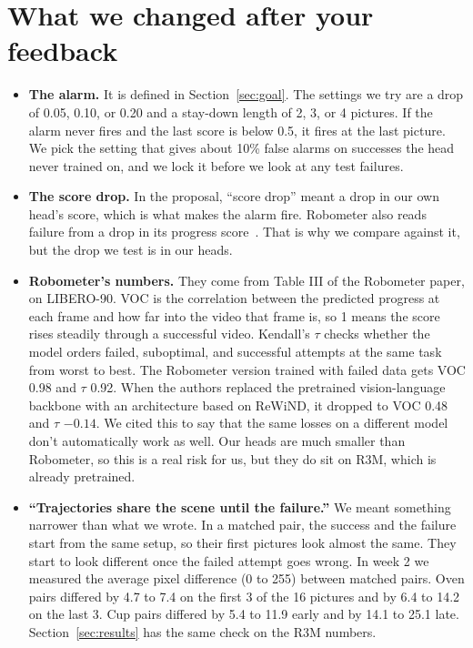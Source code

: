 \documentclass{article}
\begin{document}
\section{What we changed after your feedback}\label{sec:changes}
\begin{itemize}
\item \textbf{The alarm.} It is defined in Section~\ref{sec:goal}. The settings we try are a drop of 0.05, 0.10, or 0.20 and a stay-down length of 2, 3, or 4 pictures. If the alarm never fires and the last score is below 0.5, it fires at the last picture. We pick the setting that gives about 10\% false alarms on successes the head never trained on, and we lock it before we look at any test failures.

\item \textbf{The score drop.} In the proposal, ``score drop'' meant a drop in our own head's score, which is what makes the alarm fire. Robometer also reads failure from a drop in its progress score~\citep{robometer}. That is why we compare against it, but the drop we test is in our heads.

\item \textbf{Robometer's numbers.} They come from Table III of the Robometer paper, on LIBERO-90. VOC is the correlation between the predicted progress at each frame and how far into the video that frame is, so 1 means the score rises steadily through a successful video. Kendall's $\tau$ checks whether the model orders failed, suboptimal, and successful attempts at the same task from worst to best. The Robometer version trained with failed data gets VOC 0.98 and $\tau$ 0.92. When the authors replaced the pretrained vision-language backbone with an architecture based on ReWiND, it dropped to VOC 0.48 and $\tau$ $-0.14$. We cited this to say that the same losses on a different model don't automatically work as well. Our heads are much smaller than Robometer, so this is a real risk for us, but they do sit on R3M, which is already pretrained.

\item \textbf{``Trajectories share the scene until the failure.''} We meant something narrower than what we wrote. In a matched pair, the success and the failure start from the same setup, so their first pictures look almost the same. They start to look different once the failed attempt goes wrong. In week 2 we measured the average pixel difference (0 to 255) between matched pairs. Oven pairs differed by 4.7 to 7.4 on the first 3 of the 16 pictures and by 6.4 to 14.2 on the last 3. Cup pairs differed by 5.4 to 11.9 early and by 14.1 to 25.1 late. Section~\ref{sec:results} has the same check on the R3M numbers.


\end{itemize}
\end{document}
